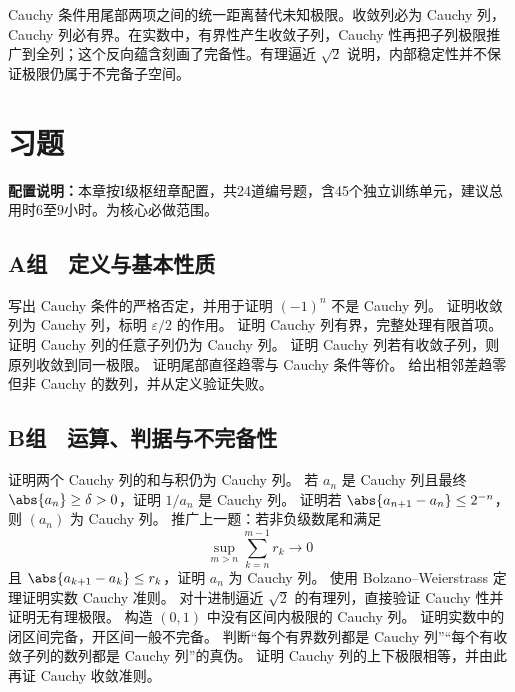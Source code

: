 Cauchy 条件用尾部两项之间的统一距离替代未知极限。收敛列必为 Cauchy 列，Cauchy 列必有界。在实数中，有界性产生收敛子列，Cauchy 性再把子列极限推广到全列；这个反向蕴含刻画了完备性。有理逼近 \(\sqrt2\) 说明，内部稳定性并不保证极限仍属于不完备子空间。

\section*{习题}

\noindent\textbf{配置说明：}本章按I级枢纽章配置，共24道编号题，含45个独立训练单元，建议总用时6至9小时。为核心必做范围。

\subsection*{A组　定义与基本性质}
\begin{enumerate}[label=\textbf{13.\arabic*.}]
  \mustdo 写出 Cauchy 条件的严格否定，并用于证明 \((-1)^n\) 不是 Cauchy 列。
  \mustdo 证明收敛列为 Cauchy 列，标明 \(\varepsilon/2\) 的作用。
  \mustdo 证明 Cauchy 列有界，完整处理有限首项。
  \mustdo 证明 Cauchy 列的任意子列仍为 Cauchy 列。
  \mustdo 证明 Cauchy 列若有收敛子列，则原列收敛到同一极限。
  \mustdo 证明尾部直径趋零与 Cauchy 条件等价。
  \mustdo 给出相邻差趋零但非 Cauchy 的数列，并从定义验证失败。
\end{enumerate}

\subsection*{B组　运算、判据与不完备性}
\begin{enumerate}[label=\textbf{13.\arabic*.},resume]
  \mustdo 证明两个 Cauchy 列的和与积仍为 Cauchy 列。
  \mustdo 若 \(a_n\) 是 Cauchy 列且最终 \(\abs{a_n}\ge\delta>0\)，证明 \(1/a_n\) 是 Cauchy 列。
  \mustdo 证明若 \(\abs{a_{n+1}-a_n}\le2^{-n}\)，则 \((a_n)\) 为 Cauchy 列。
  \mustdo 推广上一题：若非负级数尾和满足
 \[
 \sup_{m>n}\sum_{k=n}^{m-1}r_k\to0
 \]
 且 \(\abs{a_{k+1}-a_k}\le r_k\)，证明 \(a_n\) 为 Cauchy 列。
  \mustdo 使用 Bolzano--Weierstrass 定理证明实数 Cauchy 准则。
  \mustdo 对十进制逼近 \(\sqrt2\) 的有理列，直接验证 Cauchy 性并证明无有理极限。
  \mustdo 构造 \((0,1)\) 中没有区间内极限的 Cauchy 列。
  \mustdo 证明实数中的闭区间完备，开区间一般不完备。
  \mustdo 判断“每个有界数列都是 Cauchy 列”“每个有收敛子列的数列都是 Cauchy 列”的真伪。
  \mustdo 证明 Cauchy 列的上下极限相等，并由此再证 Cauchy 收敛准则。
\end{enumerate}

